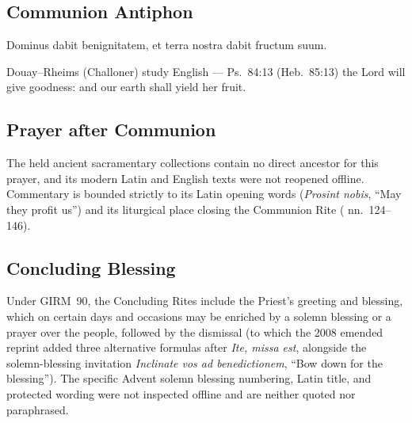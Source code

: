 \subsection{Communion Antiphon}\label{proper-communion-antiphon}
\begin{latinproper}
Dominus dabit benignitatem, et terra nostra dabit fructum suum.
\end{latinproper}
\begin{englishwitness}{Douay--Rheims (Challoner) study English --- Ps.~84:13 (Heb.~85:13)}
 the Lord will give goodness: and our earth shall yield her fruit.
\end{englishwitness}

\subsection{Prayer after Communion}\label{proper-prayer-after-communion}
The held ancient sacramentary collections contain no direct ancestor for this prayer, and its modern Latin and English texts were not reopened offline. Commentary is bounded strictly to its Latin opening words (\emph{Prosint nobis}, ``May they profit us'') and its liturgical place closing the Communion Rite ( nn.~124--146).

\subsection{Concluding Blessing}\label{proper-concluding-blessing}
Under GIRM~90, the Concluding Rites include the Priest's greeting and blessing, which on certain days and occasions may be enriched by a solemn blessing or a prayer over the people, followed by the dismissal (to which the 2008 emended reprint added three alternative formulas after \emph{Ite, missa est}, alongside the solemn-blessing invitation \emph{Inclinate vos ad benedictionem}, ``Bow down for the blessing''). The specific Advent solemn blessing numbering, Latin title, and protected wording were not inspected offline and are neither quoted nor paraphrased.
